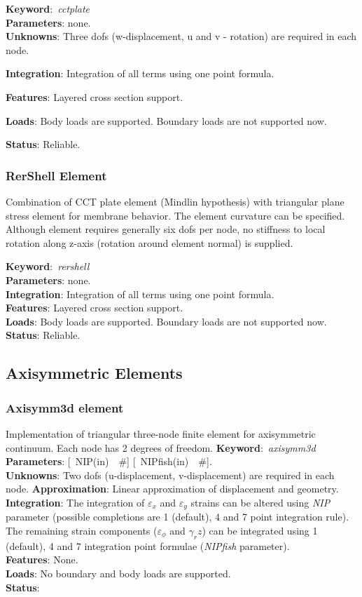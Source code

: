 \documentclass[12pt,dvips]{article}
\newcommand{\descitem}[1]{{\noindent \bf #1}:}
\newcommand{\elemkeyword}[1]{\descitem{Keyword}~{\em #1}}
\newcommand{\elemparam}[2]{{{#1\tiny (#2)}~~\#}}
\newcommand{\optelemparam}[2]{{[~\elemparam{#1}{#2}]}}
\newcommand{\param}[1]{{\it #1}}
\begin{document}
\elemkeyword{cctplate}\\
\descitem{Parameters} none.\\
\descitem{Unknowns}
Three dofs (w-displacement, u and v - rotation) are required in each node.


\descitem{Integration}
Integration of all terms using one point formula.

\descitem{Features} Layered cross section support.

\descitem{Loads} Body loads are supported. Boundary loads are
not supported now.

\descitem{Status} Reliable.

\subsubsection {RerShell Element}
Combination of CCT plate element (Mindlin hypothesis) with triangular plane stress element
for membrane behavior. The element curvature can be specified. 
Although element requires generally six dofs per node, no stiffness to
local rotation along z-axis (rotation around element normal) is supplied.

\elemkeyword{rershell}\\
\descitem{Parameters} none.\\
\descitem{Integration}
Integration of all terms using one point formula.\\
\descitem{Features} Layered cross section support.\\
\descitem{Loads} Body loads are supported. Boundary loads are
not supported now.\\
\descitem{Status} Reliable.

\subsection{Axisymmetric Elements}
\subsubsection{Axisymm3d element}
Implementation of triangular three-node finite element 
for axisymmetric continuum. Each node has 2 degrees of freedom.
\elemkeyword{axisymm3d}\\
\descitem{Parameters} \optelemparam{NIP}{in} \optelemparam{NIPfish}{in}.\\
\descitem{Unknowns}
Two dofs (u-displacement, v-displacement) are required in each node.
\descitem{Approximation} Linear approximation of displacement and
geometry.
\descitem{Integration}
The integration of $\varepsilon_x$ and $\varepsilon_y$ strains can be altered using
\param{NIP} parameter (possible completions are 1 (default), 4 and 7
point integration rule). The remaining strain components ($\varepsilon_\phi$ and
$\gamma_rz$) can be integrated using 1 (default), 4 and 7 integration
point formulae (\param{NIPfish} parameter).\\
\descitem{Features} None.\\
\descitem{Loads} No boundary and body loads are supported.\\
\descitem{Status} 
\end{document}
